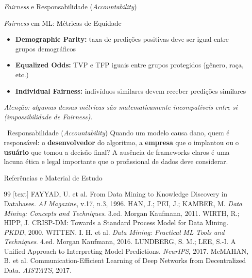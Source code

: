 \documentclass[aspectratio=169]{beamer}
\begin{document}
\begin{frame}{\textit{Fairness} e Responsabilidade (\textit{Accountability})}
    \vspace{-0.6cm}
    \begin{block}{\textit{Fairness} em ML: Métricas de Equidade}
        \begin{itemize}
            \item \textbf{Demographic Parity:} taxa de predições positivas deve ser igual entre grupos demográficos
            \item \textbf{Equalized Odds:} TVP e TFP iguais entre grupos protegidos (gênero, raça, etc.)
            \item \textbf{Individual Fairness:} indivíduos similares devem receber predições similares
        \end{itemize}
        \vspace{0.1cm}
        \textit{\small Atenção: algumas dessas métricas são matematicamente incompatíveis entre si (impossibilidade de Fairness).}
    \end{block}
    
    \begin{alertblock}{\faQuestion\ Responsabilidade (\textit{Accountability})}
        Quando um modelo causa dano, quem é responsável: o \textbf{desenvolvedor} do algoritmo, a \textbf{empresa} que o implantou ou o \textbf{usuário} que tomou a decisão final?
        A ausência de frameworks claros é uma lacuna ética e legal importante que o profissional de dados deve considerar.
    \end{alertblock}
\end{frame}


\begin{frame}{Referências e Material de Estudo}
    \begin{thebibliography}{99}
        [text]
        \tiny FAYYAD, U. et al. From Data Mining to Knowledge Discovery in Databases. \textit{AI Magazine}, v.17, n.3, 1996.
        \tiny HAN, J.; PEI, J.; KAMBER, M. \textit{Data Mining: Concepts and Techniques}. 3.ed. Morgan Kaufmann, 2011.
        \tiny WIRTH, R.; HIPP, J. CRISP-DM: Towards a Standard Process Model for Data Mining. \textit{PKDD}, 2000.
        \tiny WITTEN, I. H. et al. \textit{Data Mining: Practical ML Tools and Techniques}. 4.ed. Morgan Kaufmann, 2016.
        \tiny LUNDBERG, S. M.; LEE, S.-I. A Unified Approach to Interpreting Model Predictions. \textit{NeurIPS}, 2017.
        \tiny McMAHAN, B. et al. Communication-Efficient Learning of Deep Networks from Decentralized Data. \textit{AISTATS}, 2017.
    \end{thebibliography}
    
\end{frame}
\end{document}
